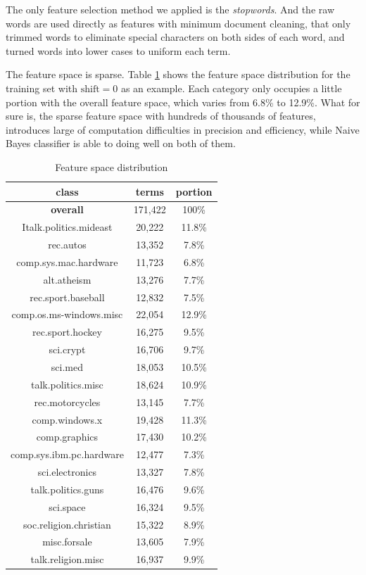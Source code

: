 \documentclass{article}
\begin{document}
The only feature selection method we applied is the \textit{stopwords}. And the raw words are used directly as features with minimum document cleaning, that only trimmed words to eliminate special characters on both sides of each word, and turned words into lower cases to uniform each term.

The feature space is sparse. Table \ref{table:feature-dist} shows the feature space distribution for the training set with $\text{shift}=0$ as an example. Each category only occupies a little portion with the overall feature space, which varies from 6.8\% to 12.9\%. What for sure is, the sparse feature space with hundreds of thousands of features, introduces large of computation difficulties in precision and efficiency, while Naive Bayes classifier is able to doing well on both of them.

\begin{table}[!ht]
	\centering
	\begin{tabular}{ |c|c|c| }
		\hline
		\textbf{class} & \textbf{terms} & \textbf{portion} \\
		\hline
		\textbf{overall} & 171,422 & 100\% \\
		\hline
		Italk.politics.mideast & 20,222 & 11.8\%\\
		\hline
		rec.autos & 13,352 & 7.8\% \\
		\hline
		comp.sys.mac.hardware & 11,723 & 6.8\% \\
		\hline
		alt.atheism & 13,276 & 7.7\%  \\
		\hline
		rec.sport.baseball & 12,832 & 7.5\% \\
		\hline
		comp.os.ms-windows.misc & 22,054 & 12.9\% \\
		\hline
		rec.sport.hockey & 16,275 & 9.5\% \\
		\hline
		sci.crypt & 16,706 & 9.7\% \\
		\hline
		sci.med & 18,053 & 10.5\% \\
		\hline
		talk.politics.misc & 18,624 & 10.9\% \\
		\hline
		rec.motorcycles & 13,145 & 7.7\% \\
		\hline
		comp.windows.x & 19,428 & 11.3\% \\
		\hline
		comp.graphics & 17,430 & 10.2\% \\
		\hline
		comp.sys.ibm.pc.hardware & 12,477 & 7.3\% \\
		\hline
		sci.electronics & 13,327 & 7.8\% \\
		\hline
		talk.politics.guns & 16,476 & 9.6\% \\
		\hline
		sci.space & 16,324 & 9.5\% \\
		\hline
		soc.religion.christian & 15,322 & 8.9\% \\
		\hline
		misc.forsale & 13,605 & 7.9\% \\
		\hline
		talk.religion.misc & 16,937 & 9.9\% \\
		\hline
	\end{tabular}
	\caption{Feature space distribution}
	\label{table:feature-dist}
\end{table}
\end{document}
